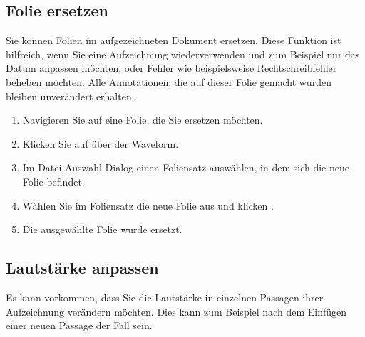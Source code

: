 \subsection{Folie ersetzen}
Sie können Folien im aufgezeichneten Dokument ersetzen. Diese Funktion ist hilfreich, wenn Sie eine Aufzeichnung wiederverwenden und zum Beispiel nur das Datum anpassen möchten, oder Fehler wie beispielsweise Rechtschreibfehler beheben möchten. Alle Annotationen, die auf dieser Folie gemacht wurden bleiben unverändert erhalten.

\begin{enumerate}
	\item Navigieren Sie auf eine Folie, die Sie ersetzen möchten.
	\item Klicken Sie auf  \editorreplacepage{} über der Waveform.
	\item Im Datei-Auswahl-Dialog einen Foliensatz auswählen, in dem sich die neue Folie befindet.
	\item Wählen Sie im Foliensatz die neue Folie aus und klicken .
	\item Die ausgewählte Folie wurde ersetzt.
\end{enumerate}


\subsection{Lautstärke anpassen}
Es kann vorkommen, dass Sie die Lautstärke in einzelnen Passagen ihrer Aufzeichnung verändern möchten. Dies kann zum Beispiel nach dem Einfügen einer neuen Passage der Fall sein.

